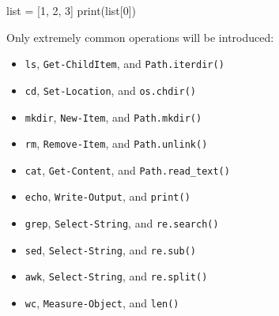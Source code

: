 \documentclass[
  letterpaper,
  DIV=11,
  numbers=noendperiod]{scrartcl}
\newenvironment{Shaded}{\begin{snugshade}}{\end{snugshade}}
\newcommand{\BuiltInTok}[1]{\textcolor[rgb]{0.00,0.23,0.31}{#1}}
\newcommand{\DecValTok}[1]{\textcolor[rgb]{0.68,0.00,0.00}{#1}}
\newcommand{\FunctionTok}[1]{\textcolor[rgb]{0.28,0.35,0.67}{#1}}
\newcommand{\NormalTok}[1]{\textcolor[rgb]{0.00,0.23,0.31}{#1}}
\newcommand{\OperatorTok}[1]{\textcolor[rgb]{0.37,0.37,0.37}{#1}}
\newcommand{\VariableTok}[1]{\textcolor[rgb]{0.07,0.07,0.07}{#1}}
\providecommand{\tightlist}{%
  \setlength{\itemsep}{0pt}\setlength{\parskip}{0pt}}\usepackage{longtable,booktabs,array}
\begin{document}
\begin{itemize}
\begin{Shaded}
\end{Shaded}

\begin{Shaded}
\begin{Highlighting}[]
\BuiltInTok{list} \OperatorTok{=}\NormalTok{ [}\DecValTok{1}\NormalTok{, }\DecValTok{2}\NormalTok{, }\DecValTok{3}\NormalTok{]}
\BuiltInTok{print}\NormalTok{(}\BuiltInTok{list}\NormalTok{[}\DecValTok{0}\NormalTok{])}
\end{Highlighting}
\end{Shaded}

\begin{Shaded}
\end{Shaded}
\end{itemize}

Only extremely common operations will be introduced:

\begin{itemize}
\tightlist
\item
  \texttt{ls}, \texttt{Get-ChildItem}, and \texttt{Path.iterdir()}
\item
  \texttt{cd}, \texttt{Set-Location}, and \texttt{os.chdir()}
\item
  \texttt{mkdir}, \texttt{New-Item}, and \texttt{Path.mkdir()}
\item
  \texttt{rm}, \texttt{Remove-Item}, and \texttt{Path.unlink()}
\item
  \texttt{cat}, \texttt{Get-Content}, and \texttt{Path.read\_text()}
\item
  \texttt{echo}, \texttt{Write-Output}, and \texttt{print()}
\item
  \texttt{grep}, \texttt{Select-String}, and \texttt{re.search()}
\item
  \texttt{sed}, \texttt{Select-String}, and \texttt{re.sub()}
\item
  \texttt{awk}, \texttt{Select-String}, and \texttt{re.split()}
\item
  \texttt{wc}, \texttt{Measure-Object}, and \texttt{len()}
\end{itemize}
\end{document}

